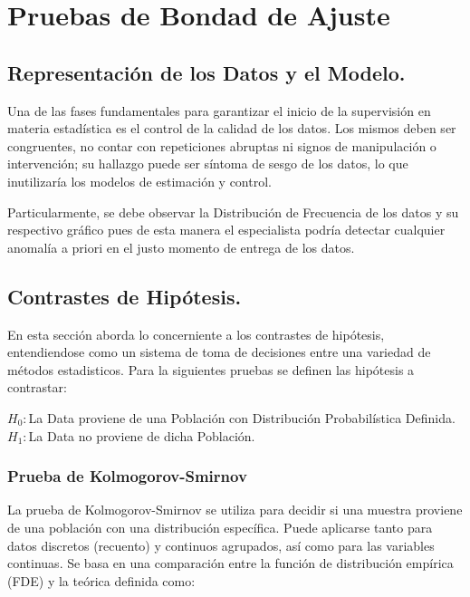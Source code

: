 \documentclass[]{article}
\begin{document}
\hypertarget{pruebas-de-bondad-de-ajuste}{%
\section{Pruebas de Bondad de
Ajuste}\label{pruebas-de-bondad-de-ajuste}}

\hypertarget{representacion-de-los-datos-y-el-modelo.}{%
\subsection{Representación de los Datos y el
Modelo.}\label{representacion-de-los-datos-y-el-modelo.}}

Una de las fases fundamentales para garantizar el inicio de la
supervisión en materia estadística es el control de la calidad de los
datos. Los mismos deben ser congruentes, no contar con repeticiones
abruptas ni signos de manipulación o intervención; su hallazgo puede ser
síntoma de sesgo de los datos, lo que inutilizaría los modelos de
estimación y control.

Particularmente, se debe observar la Distribución de Frecuencia de los
datos y su respectivo gráfico pues de esta manera el especialista podría
detectar cualquier anomalía a priori en el justo momento de entrega de
los datos.

\hypertarget{contrastes-de-hipotesis.}{%
\subsection{Contrastes de Hipótesis.}\label{contrastes-de-hipotesis.}}

En esta sección aborda lo concerniente a los contrastes de hipótesis,
entendiendose como un sistema de toma de decisiones entre una variedad
de métodos estadisticos. Para la siguientes pruebas se definen las
hipótesis a contrastar:

\(H_0:\)La Data proviene de una Población con Distribución
Probabilística Definida.\\
\(H_1:\)La Data no proviene de dicha Población.

\hypertarget{prueba-de-kolmogorov-smirnov}{%
\subsubsection{Prueba de
Kolmogorov-Smirnov}\label{prueba-de-kolmogorov-smirnov}}

La prueba de Kolmogorov-Smirnov se utiliza para decidir si una muestra
proviene de una población con una distribución específica. Puede
aplicarse tanto para datos discretos (recuento) y continuos agrupados,
así como para las variables continuas. Se basa en una comparación entre
la función de distribución empírica (FDE) y la teórica definida como:
\end{document}
